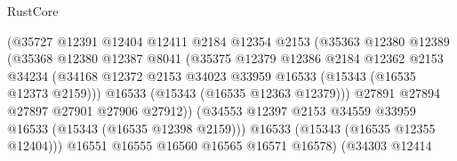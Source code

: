 \begin{lexlean}{RustCore}
\begin{coremodule}
                                    (@35727
                                      @12391
                                      @12404
                                      @12411
                                      @2184
                                      @12354
                                      @2153
                                      (@35363
                                        @12380
                                        @12389
                                        (@35368
                                          @12380
                                          @12387
                                          @8041
                                          (@35375
                                            @12379
                                            @12386
                                            @2184
                                            @12362
                                            @2153
                                            @34234
                                            (@34168
                                              @12372
                                              @2153
                                              @34023
                                              @33959
                                              @16533
                                              (@15343 (@16535 @12373 @2159)))
                                            @16533
                                            (@15343 (@16535 @12363 @12379)))
                                          @27891
                                          @27894
                                          @27897
                                          @27901
                                          @27906
                                          @27912))
                                      (@34553
                                        @12397
                                        @2153
                                        @34559
                                        @33959
                                        @16533
                                        (@15343 (@16535 @12398 @2159)))
                                      @16533
                                      (@15343 (@16535 @12355 @12404)))
                                    @16551
                                    @16555
                                    @16560
                                    @16565
                                    @16571
                                    @16578)
                                  (@34303
                                    @12414

\end{coremodule}
\end{lexlean}
